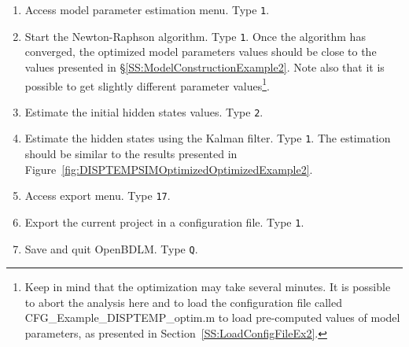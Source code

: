 \begin{enumerate}
\item Access model parameter estimation menu. Type \colorbox{light-gray}{\lstinline[basicstyle = \mlttfamily \small, backgroundcolor = \color{light-gray}]!1!}. 
\item Start the Newton-Raphson algorithm. Type \colorbox{light-gray}{\lstinline[basicstyle = \mlttfamily \small, backgroundcolor = \color{light-gray}]!1!}. Once the algorithm has converged, the optimized model parameters values should be close to the values presented in \S\ref{SS:ModelConstructionExample2}. Note also that it is possible to get slightly different parameter values\footnote{Keep in mind that the optimization may take several minutes. It is possible to abort the analysis here and to load the configuration file called CFG\_Example\_DISPTEMP\_optim.m to load pre-computed values of model parameters, as presented in Section~\ref{SS:LoadConfigFileEx2}.}.
\item Estimate the initial hidden states values. Type \colorbox{light-gray}{\lstinline[basicstyle = \mlttfamily \small, backgroundcolor = \color{light-gray}]!2!}.
\item Estimate the hidden states using the Kalman filter. Type \colorbox{light-gray}{\lstinline[basicstyle = \mlttfamily \small, backgroundcolor = \color{light-gray}]!1!}. The estimation should be similar to the results presented in Figure~\ref{fig:DISPTEMPSIMOptimizedOptimizedExample2}.
\item Access export menu. Type \colorbox{light-gray}{\lstinline[basicstyle = \mlttfamily \small, backgroundcolor = \color{light-gray}]!17!}. 
\item Export the current project in a configuration file. Type \colorbox{light-gray}{\lstinline[basicstyle = \mlttfamily \small, backgroundcolor = \color{light-gray}]!1!}.
\item Save and quit OpenBDLM. Type \colorbox{light-gray}{\lstinline[basicstyle = \mlttfamily \small, backgroundcolor = \color{light-gray}]!Q!}.
\end{enumerate}




